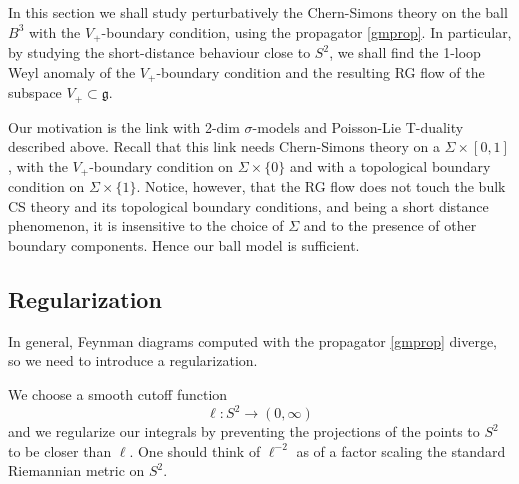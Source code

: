 \documentclass[a4paper]{amsart}
\theoremstyle{plain}
\theoremstyle{definition}
\newcommand{\g}{\mathfrak{g}}
\newcommand{\h}{\mathfrak{h}}
\newcommand{\cf}{\mathsf{Conf}}
\begin{document}
 In this section we shall study perturbatively the Chern-Simons theory on the ball $B^3$ with the $V_+$-boundary condition, using the propagator \eqref{gmprop}. In particular, by studying  the short-distance behaviour close to $S^2$, we shall find the 1-loop Weyl anomaly of the $V_+$-boundary condition and the resulting RG flow of the subspace $V_+\subset\g$.
 
Our motivation is the link with 2-dim $\sigma$-models and Poisson-Lie T-duality described above. Recall that this link needs Chern-Simons theory on a $\Sigma\times[0,1]$, with the $V_+$-boundary condition on $\Sigma\times\{0\}$ and with a topological boundary condition on $\Sigma\times\{1\}$. Notice, however, that the RG flow does not touch the bulk CS theory and its topological boundary conditions, and being a short distance phenomenon, it is insensitive to the choice of $\Sigma$ and to the presence of other boundary components. Hence our ball model is sufficient.




\subsection{Regularization}

In general, Feynman diagrams computed with the propagator \eqref{gmprop} diverge, so we need to introduce a regularization.

We choose a smooth cutoff function
$$\ell\colon S^2\to(0,\infty)$$ and  we regularize our integrals by preventing the projections of the points to $S^2$ to be closer than $\ell$. One should think of $\ell^{-2}$ as of a factor scaling the standard Riemannian metric on $S^2$. 
\end{document}
